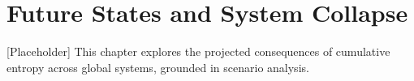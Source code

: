 \chapter{Future States and System Collapse}
[Placeholder] This chapter explores the projected consequences of cumulative
 entropy across global systems, grounded in scenario analysis.

